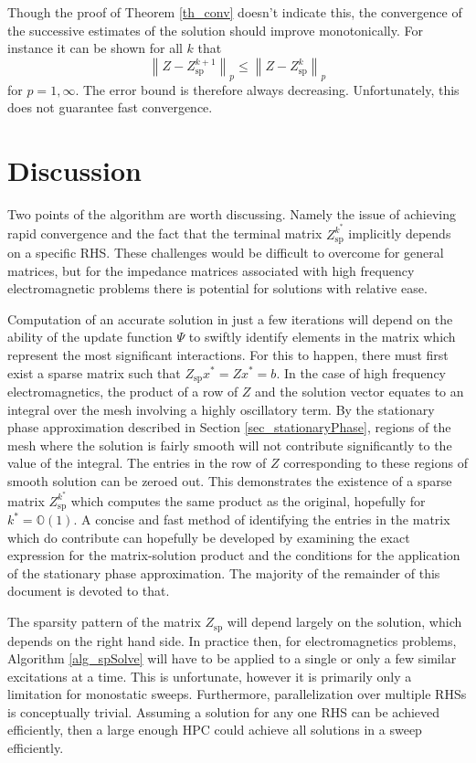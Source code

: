 \documentclass{article}
\newcommand{\norm}[1]{\left\lVert #1 \right\rVert}
\theoremstyle{plain}
\begin{document}
Though the proof of Theorem \ref{th_conv} doesn't indicate this, the convergence of the successive estimates of the solution should improve monotonically.
For instance it can be shown for all $k$ that
\begin{equation}
	\norm{Z-Z_{\text{sp}}^{k+1}}_p \leq \norm{Z-Z_{\text{sp}}^{k}}_p
\end{equation}
for $p=1,\infty$.
The error bound is therefore always decreasing.
Unfortunately, this does not guarantee fast convergence.



\section{Discussion}\label{sec_disc}


Two points of the algorithm are worth discussing.
Namely the issue of achieving rapid convergence and the fact that the terminal matrix
$Z_{\text{sp}}^{k^*}$ implicitly depends on a specific RHS.
These challenges would be difficult to overcome for general matrices,
but for the impedance matrices associated with high frequency electromagnetic problems there is potential for solutions
with relative ease.

Computation of an accurate solution in just a few iterations will depend on the ability of the update function $\Psi$ to 
swiftly identify elements in the matrix which represent the most significant interactions.
For this to happen, there must first exist a sparse matrix such that $Z_{\text{sp}} x^* = Zx^* = b$.
In the case of high frequency electromagnetics, the product of a row of $Z$ and the solution vector equates to an integral over the mesh
involving a highly oscillatory term.
By the stationary phase approximation described in Section \ref{sec_stationaryPhase},
regions of the mesh where the solution is fairly smooth will not contribute significantly to the value of the integral.
The entries in the row of $Z$ corresponding to these regions of smooth solution can be zeroed out.
This demonstrates the existence of a sparse matrix $Z_{\text{sp}}^{k^*}$ which computes the same product as the original,
hopefully for $k^* = \mathbb{O}(1)$.
A concise and fast method of identifying the entries in the matrix which do contribute can hopefully be developed by examining
the exact expression for the matrix-solution product and the conditions for the application of the stationary phase approximation.
The majority of the remainder of this document is devoted to that.

The sparsity pattern of the matrix $Z_{\text{sp}}$ will depend largely on the solution, which depends on the right hand side.
In practice then, for electromagnetics problems, Algorithm \ref{alg_spSolve} will have to be applied to a single or only a few similar excitations at a time.
This is unfortunate, however it is primarily only a limitation for monostatic sweeps.
Furthermore, parallelization over multiple RHSs is conceptually trivial.
Assuming a solution for any one RHS can be achieved efficiently, then a large enough HPC could achieve all solutions in a sweep efficiently.
\end{document}

